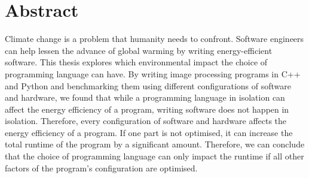 \chapter*{Abstract}

Climate change is a problem that humanity needs to confront.
Software engineers can help lessen the advance of global warming by writing energy-efficient software.
This thesis explores which environmental impact the choice of programming language can have.
By writing image processing programs in C++ and Python and benchmarking them using different configurations of software and
hardware, we found that while a programming language in isolation can affect the energy efficiency of a program,
writing software does not happen in isolation.
Therefore, every configuration of software and hardware affects the energy efficiency of a program.
If one part is not optimised, it can increase the total runtime of the program by a significant amount.
Therefore, we can conclude that the choice of programming language can only impact the runtime if all other factors of the program's configuration are optimised.
